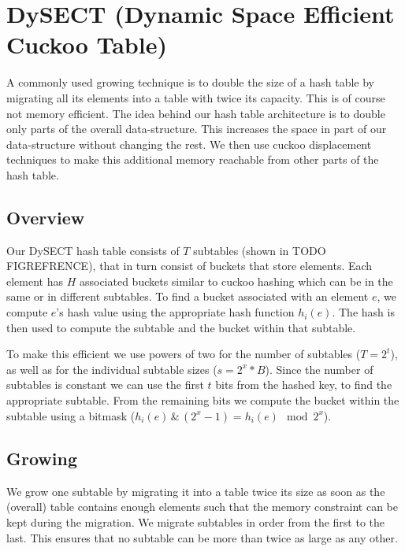 \documentclass[a4paper,UKenglish]{lipics-v2016}
\begin{document}
\section{DySECT (Dynamic Space Efficient Cuckoo Table)}
A commonly used growing technique is to double the size of a hash
table by migrating all its elements into a table with twice its
capacity.  This is of course not memory efficient.  The idea behind
our hash table architecture is to double only parts of the overall
data-structure.  This increases the space in part of our
data-structure without changing the rest.  We then use cuckoo
displacement techniques to make this additional memory reachable from
other parts of the hash table.

\subsection{Overview}
Our DySECT hash table consists of $T$ subtables (shown in TODO
FIGREFRENCE), that in turn consist of buckets that store elements.
Each element has $H$ associated
buckets similar to cuckoo hashing which can be in the same or
in different subtables.  To find a bucket associated with an element $e$,
we compute $e$'s hash value using the appropriate hash function
$h_i(e)$. The hash is then used to compute the subtable and the bucket
within that subtable.

To make this efficient we use powers of two for the number of
subtables ($T = 2^t$), as well as for the individual subtable sizes ($s =
2^x*B$).  Since the number of subtables is constant we can use the
first $t$ bits from the hashed key, to find the appropriate subtable.
From the remaining bits we compute the bucket within the subtable using
a bitmask ($h_i(e)\,\texttt{\&}\,(2^x-1) = h_i(e) \mod 2^x$).



\subsection{Growing}
We grow one subtable by migrating it into a table twice its size
as soon as the (overall) table contains enough elements such that the memory constraint
can be kept during the migration.  We migrate subtables in order
from the first to the last. This ensures that no subtable can be more than
twice as large as any other.
\end{document}
